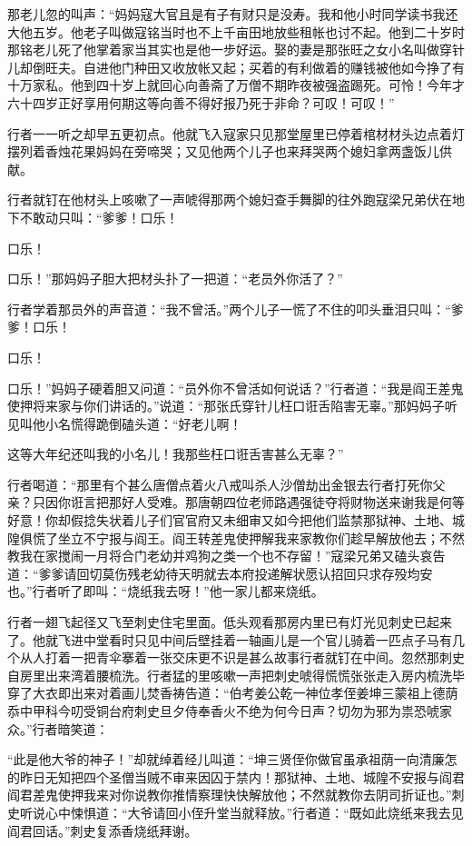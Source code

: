 \documentclass[12pt,UTF8]{ctexbook}
\begin{document}
{	那老儿忽的叫声：“妈妈寇大官且是有子有财只是没寿。我和他小时同学读书我还大他五岁。他老子叫做寇铭当时也不上千亩田地放些租帐也讨不起。他到二十岁时那铭老儿死了他掌着家当其实也是他一步好运。娶的妻是那张旺之女小名叫做穿针儿却倒旺夫。自进他门种田又收放帐又起；买着的有利做着的赚钱被他如今挣了有十万家私。他到四十岁上就回心向善斋了万僧不期昨夜被强盗踢死。可怜！今年才六十四岁正好享用何期这等向善不得好报乃死于非命？可叹！可叹！”
	
	行者一一听之却早五更初点。他就飞入寇家只见那堂屋里已停着棺材材头边点着灯摆列着香烛花果妈妈在旁啼哭；又见他两个儿子也来拜哭两个媳妇拿两盏饭儿供献。
	
	行者就钉在他材头上咳嗽了一声唬得那两个媳妇查手舞脚的往外跑寇梁兄弟伏在地下不敢动只叫：“爹爹！口乐！
	
	口乐！
	
	口乐！”那妈妈子胆大把材头扑了一把道：“老员外你活了？”
	
	行者学着那员外的声音道：“我不曾活。”两个儿子一慌了不住的叩头垂泪只叫：“爹爹！口乐！
	
	口乐！
	
	口乐！”妈妈子硬着胆又问道：“员外你不曾活如何说话？”行者道：“我是阎王差鬼使押将来家与你们讲话的。”说道：“那张氏穿针儿枉口诳舌陷害无辜。”那妈妈子听见叫他小名慌得跪倒磕头道：“好老儿啊！
	
	这等大年纪还叫我的小名儿！我那些枉口诳舌害甚么无辜？”
	
	行者喝道：“那里有个甚么唐僧点着火八戒叫杀人沙僧劫出金银去行者打死你父亲？只因你诳言把那好人受难。那唐朝四位老师路遇强徒夺将财物送来谢我是何等好意！你却假捻失状着儿子们官官府又未细审又如今把他们监禁那狱神、土地、城隍俱慌了坐立不宁报与阎王。阎王转差鬼使押解我来家教你们趁早解放他去；不然教我在家搅闹一月将合门老幼并鸡狗之类一个也不存留！”寇梁兄弟又磕头哀告道：“爹爹请回切莫伤残老幼待天明就去本府投递解状愿认招回只求存殁均安也。”行者听了即叫：“烧纸我去呀！”他一家儿都来烧纸。
	
	行者一翅飞起径又飞至刺史住宅里面。低头观看那房内里已有灯光见刺史已起来了。他就飞进中堂看时只见中间后壁挂着一轴画儿是一个官儿骑着一匹点子马有几个从人打着一把青伞搴着一张交床更不识是甚么故事行者就钉在中间。忽然那刺史自房里出来湾着腰梳洗。行者猛的里咳嗽一声把刺史唬得慌慌张张走入房内梳洗毕穿了大衣即出来对着画儿焚香祷告道：“伯考姜公乾一神位孝侄姜坤三蒙祖上德荫忝中甲科今叨受铜台府刺史旦夕侍奉香火不绝为何今日声？切勿为邪为祟恐唬家众。”行者暗笑道：
	
	“此是他大爷的神子！”却就绰着经儿叫道：“坤三贤侄你做官虽承祖荫一向清廉怎的昨日无知把四个圣僧当贼不审来因囚于禁内！那狱神、土地、城隍不安报与阎君阎君差鬼使押我来对你说教你推情察理快快解放他；不然就教你去阴司折证也。”刺史听说心中悚惧道：“大爷请回小侄升堂当就释放。”行者道：“既如此烧纸来我去见阎君回话。”刺史复添香烧纸拜谢。
	
}
\end{document}
